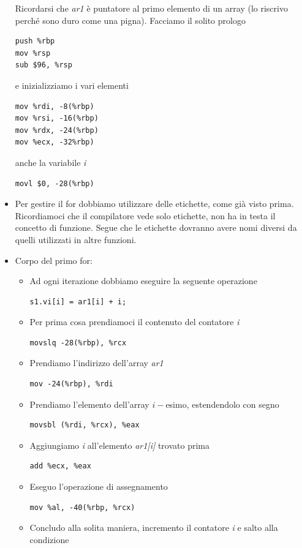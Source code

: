 \documentclass[11pt]{report}
\theoremstyle{definition}
\begin{document}
\begin{itemize}
\begin{center}
\end{center}  
Ricordarsi che \emph{ar1} è puntatore al primo elemento di un array (lo riscrivo perché sono duro come una pigna). Facciamo il solito prologo
\begin{verbatim}
push %rbp
mov %rsp
sub $96, %rsp
\end{verbatim}
e inizializziamo i vari elementi
\begin{verbatim}
mov %rdi, -8(%rbp)
mov %rsi, -16(%rbp)
mov %rdx, -24(%rbp)
mov %ecx, -32%rbp)
\end{verbatim}
anche la variabile \emph{i}
\begin{verbatim}
movl $0, -28(%rbp)
\end{verbatim}
\item Per gestire il for dobbiamo utilizzare delle etichette, come già visto prima. Ricordiamoci che il compilatore vede solo etichette, non ha in testa il concetto di funzione. Segue che le etichette dovranno avere nomi diversi da quelli utilizzati in altre funzioni.
\item Corpo del primo for:
\begin{itemize}
\item Ad ogni iterazione dobbiamo eseguire la seguente operazione
\begin{verbatim}
s1.vi[i] = ar1[i] + i;
\end{verbatim}
\item Per prima cosa prendiamoci il contenuto del contatore \emph{i}
\begin{verbatim}
movslq -28(%rbp), %rcx
\end{verbatim}
\item Prendiamo l'indirizzo dell'array \emph{ar1}
\begin{verbatim}
mov -24(%rbp), %rdi
\end{verbatim}
\item Prendiamo l'elemento dell'array $i-$esimo, estendendolo con segno
\begin{verbatim}
movsbl (%rdi, %rcx), %eax
\end{verbatim}
\item Aggiungiamo \emph{i} all'elemento \emph{ar1[i]} trovato prima
\begin{verbatim}
add %ecx, %eax
\end{verbatim}
\item Eseguo l'operazione di assegnamento
\begin{verbatim}
mov %al, -40(%rbp, %rcx)
\end{verbatim}
\item Concludo alla solita maniera, incremento il contatore \emph{i} e salto alla condizione

\end{itemize}
\end{itemize}
\end{document}
